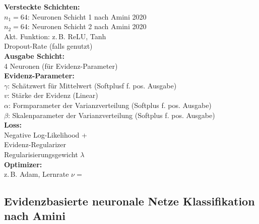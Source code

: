 \begin{center}
\begin{minipage}[t]{0.48\textwidth}
\textbf{Versteckte Schichten:} \\
$n_1 = 64$: Neuronen Schicht 1 nach Amini 2020 \\
$n_2 = 64$: Neuronen Schicht 2 nach Amini 2020 \\
Akt. Funktion: z.\,B. ReLU, Tanh \\
Dropout-Rate (falls genutzt) \\[4pt]

\textbf{Ausgabe Schicht:} \\
4 Neuronen (für Evidenz-Parameter) \\[4pt]

\textbf{Evidenz-Parameter:} \\
$\gamma$: Schätzwert für Mittelwert (Softplusf f. pos. Ausgabe) \\
$v$: Stärke der Evidenz (Linear)\\
$\alpha$: Formparameter der Varianzverteilung (Softplus f. pos. Ausgabe)\\
$\beta$: Skalenparameter der Varianzverteilung (Softplus f. pos. Ausgabe)\\[4pt]

\textbf{Loss:} \\
Negative Log-Likelihood + \\
Evidenz-Regularizer \\
Regularisierungsgewicht $\lambda$ \\[4pt]

\textbf{Optimizer:} \\
z.\,B. Adam, Lernrate $\nu = $ 
\end{minipage}
\end{center}

\newpage



\subsection*{\gls{Evidenzbasierte neuronale Netze} Klassifikation nach Amini \parencite{amini2020deep}}

\par\noindent\\

